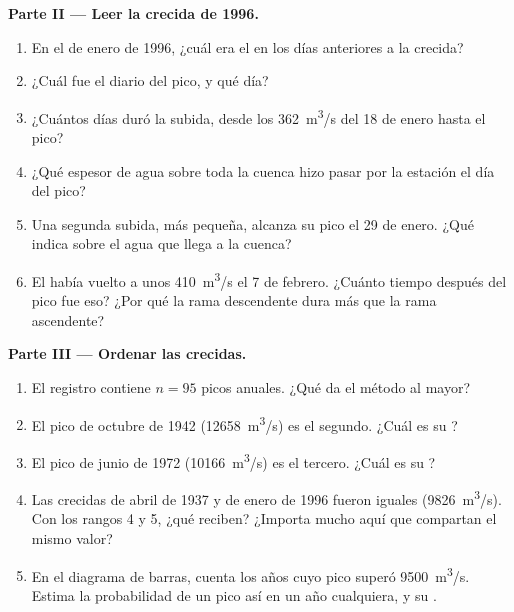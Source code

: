 \begin{problem}
\medskip
\noindent\textbf{Parte II --- Leer la crecida de 1996.}
\begin{enumerate}[resume]
  \item En el  de enero de 1996, ¿cuál era el  en los
        días anteriores a la crecida?
  \item ¿Cuál fue el  diario del pico, y qué día?
  \item ¿Cuántos días duró la subida, desde los \qty{362}{m^3/s} del
        18 de enero hasta el pico?
  \item ¿Qué espesor de agua sobre toda la cuenca hizo pasar por la estación
        el día del pico?
  \item Una segunda subida, más pequeña, alcanza su pico el 29 de enero. ¿Qué
        indica sobre el agua que llega a la cuenca?
  \item El  había vuelto a unos \qty{410}{m^3/s} el 7 de febrero.
        ¿Cuánto tiempo después del pico fue eso? ¿Por qué la rama
        descendente dura más que la rama ascendente?
\end{enumerate}

\medskip
\noindent\textbf{Parte III --- Ordenar las crecidas.}
\begin{enumerate}[resume]
  \item El registro contiene $n = 95$ picos anuales. ¿Qué 
        da el método al mayor?
  \item El pico de octubre de 1942 (\qty{12658}{m^3/s}) es el segundo. ¿Cuál
        es su ?
  \item El pico de junio de 1972 (\qty{10166}{m^3/s}) es el tercero. ¿Cuál es
        su ?
  \item Las crecidas de abril de 1937 y de enero de 1996 fueron iguales
        (\qty{9826}{m^3/s}). Con los rangos 4 y 5, ¿qué 
        reciben? ¿Importa mucho aquí que compartan el mismo valor?
  \item En el diagrama de barras, cuenta los años cuyo pico superó
        \qty{9500}{m^3/s}. Estima la probabilidad de un pico así en un año
        cualquiera, y su .
\end{enumerate}


\end{problem}
